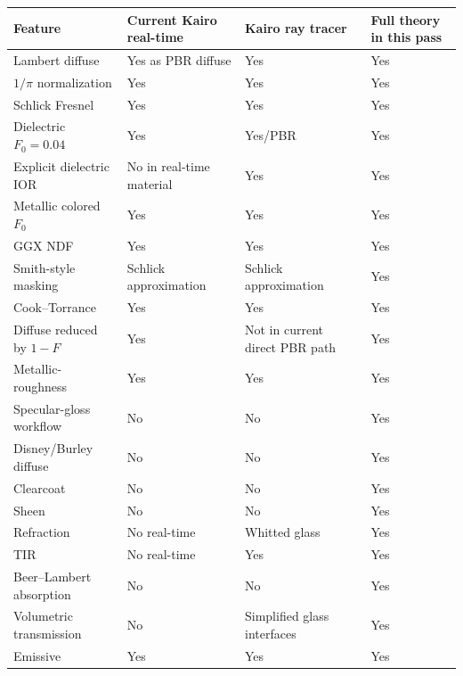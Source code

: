 {\def\LTcaptype{none} %
\begin{longtable}[]{@{}
  >{\raggedright\arraybackslash}p{}
  >{\raggedleft\arraybackslash}p{}
  >{\raggedleft\arraybackslash}p{}
  >{\raggedleft\arraybackslash}p{}@{}}
\toprule\noalign{}
\begin{minipage}[b]{\linewidth}\raggedright
Feature
\end{minipage} & \begin{minipage}[b]{\linewidth}\raggedleft
Current Kairo real-time
\end{minipage} & \begin{minipage}[b]{\linewidth}\raggedleft
Kairo ray tracer
\end{minipage} & \begin{minipage}[b]{\linewidth}\raggedleft
Full theory in this pass
\end{minipage} \\
\midrule\noalign{}
\endhead
\bottomrule\noalign{}
\endlastfoot
Lambert diffuse & Yes as PBR diffuse & Yes & Yes \\
\(1/\pi\) normalization & Yes & Yes & Yes \\
Schlick Fresnel & Yes & Yes & Yes \\
Dielectric \(F_0=0.04\) & Yes & Yes/PBR & Yes \\
Explicit dielectric IOR & No in real-time material & Yes & Yes \\
Metallic colored \(F_0\) & Yes & Yes & Yes \\
GGX NDF & Yes & Yes & Yes \\
Smith-style masking & Schlick approximation & Schlick approximation & Yes \\
Cook--Torrance & Yes & Yes & Yes \\
Diffuse reduced by \(1-F\) & Yes & Not in current direct PBR path & Yes \\
Metallic-roughness & Yes & Yes & Yes \\
Specular-gloss workflow & No & No & Yes \\
Disney/Burley diffuse & No & No & Yes \\
Clearcoat & No & No & Yes \\
Sheen & No & No & Yes \\
Refraction & No real-time & Whitted glass & Yes \\
TIR & No real-time & Yes & Yes \\
Beer--Lambert absorption & No & No & Yes \\
Volumetric transmission & No & Simplified glass interfaces & Yes \\
Emissive & Yes & Yes & Yes \\
\end{longtable}
}

